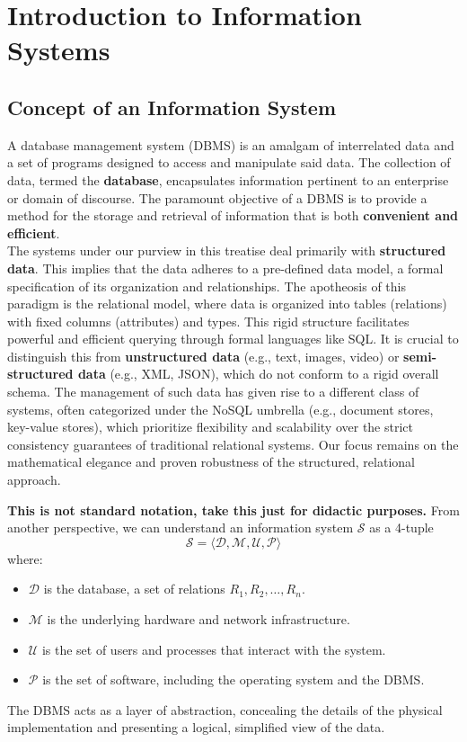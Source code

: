 \chapter{Introduction to Information Systems}

\section{Concept of an Information System}

A database management system (DBMS) is an amalgam of interrelated data and a set of programs designed to access and manipulate said data. The collection of data, termed the \textbf{database}, encapsulates information pertinent to an enterprise or domain of discourse. The paramount objective of a DBMS is to provide a method for the storage and retrieval of information that is both \textbf{convenient and efficient}. \\

The systems under our purview in this treatise deal primarily with \textbf{structured data}. This implies that the data adheres to a pre-defined data model, a formal specification of its organization and relationships. The apotheosis of this paradigm is the relational model, where data is organized into tables (relations) with fixed columns (attributes) and types. This rigid structure facilitates powerful and efficient querying through formal languages like SQL. It is crucial to distinguish this from \textbf{unstructured data} (e.g., text, images, video) or \textbf{semi-structured data} (e.g., XML, JSON), which do not conform to a rigid overall schema. The management of such data has given rise to a different class of systems, often categorized under the NoSQL umbrella (e.g., document stores, key-value stores), which prioritize flexibility and scalability over the strict consistency guarantees of traditional relational systems. Our focus remains on the mathematical elegance and proven robustness of the structured, relational approach.

\begin{mdframed}
\textbf{This is not standard notation, take this just for didactic purposes.}
From another perspective, we can understand an information system $\mathcal{S}$ as a 4-tuple
\[\mathcal{S} = \langle \mathcal{D}, \mathcal{M}, \mathcal{U}, \mathcal{P} \rangle\]
where:
\begin{itemize}
    \item $\mathcal{D}$ is the database, a set of relations $R_1, R_2, \dots, R_n$.
    \item $\mathcal{M}$ is the underlying hardware and network infrastructure.
    \item $\mathcal{U}$ is the set of users and processes that interact with the system.
    \item $\mathcal{P}$ is the set of software, including the operating system and the DBMS.
\end{itemize}

The DBMS acts as a layer of abstraction, concealing the details of the physical implementation and presenting a logical, simplified view of the data.
\end{mdframed}

